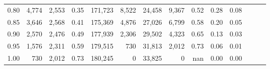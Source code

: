 \begin{tabular}{rrrrrrrrrrrrrr}
0.80 &   4,774 &  2,553 &  0.35 &  171,723 &    8,522 &  24,458 &   9,367 &  0.52 &  0.28 &      0.08 \\
0.85 &   3,646 &  2,568 &  0.41 &  175,369 &    4,876 &  27,026 &   6,799 &  0.58 &  0.20 &      0.05 \\
0.90 &   2,570 &  2,476 &  0.49 &  177,939 &    2,306 &  29,502 &   4,323 &  0.65 &  0.13 &      0.03 \\
0.95 &   1,576 &  2,311 &  0.59 &  179,515 &      730 &  31,813 &   2,012 &  0.73 &  0.06 &      0.01 \\
1.00 &     730 &  2,012 &  0.73 &  180,245 &        0 &  33,825 &       0 &   nan &  0.00 &      0.00 \\
\bottomrule
\end{tabular}

